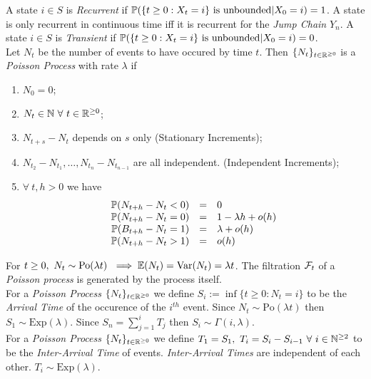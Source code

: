 \documentclass[11pt,a4paper]{article}
\begin{document}
A state $i\in S$ is \textit{Recurrent} if $\prob(\{t\geq0:X_t=i\}\mathrm{\ is\ unbounded}|X_0=i)=1$. A state is only recurrent in continuous time iff it is recurrent for the \textit{Jump Chain} $Y_n$.
A state $i\in S$ is \textit{Transient} if $\prob(\{t\geq0:X_t=i\}\mathrm{\ is\ unbounded}|X_0=i)=0$.\\

Let $N_t$ be the number of events to have occured by time $t$. Then $\{N_t\}_{t\in\mathbb{R}^{\geq0}}$ is a \textit{Poisson Process} with rate $\lambda$ if
\begin{enumerate}
	\item $N_0=0$;
	\item $N_t\in\nats\ \forall\ t\in\reals^{\geq0}$;
	\item $N_{t+s}-N_t$ depends on $s$ only (Stationary Increments);
	\item $N_{t_2}-N_{t_1},\dots,N_{t_n}-N_{t_{n-1}}$ are all independent. (Independent Increments);
	\item $\forall\ t,h>0$ we have
	\[\begin{array}{rcl}
	\mathbb{P}(N_{t+h}-N_t<0)&=&0\\
	\mathbb{P}(N_{t+h}-N_t=0)&=&1-\lambda h+o(h)\\
	\mathbb{P}(B_{t+h}-N_t=1)&=&\lambda+o(h)\\
	\mathbb{P}(N_{t+h}-N_t>1)&=&o(h)
	\end{array}\]
\end{enumerate}
For $t\geq0,\ N_t\sim\mathrm{Po}(\lambda t)\ \implies\mathbb{E}(N_t)=\mathrm{Var}(N_t)=\lambda t$. The filtration $\mathcal{F}_t$ of a \textit{Poisson process} is generated by the process itself.\\

For a \textit{Poisson Process} $\{N_t\}_{t\in\mathbb{R}^{\geq0}}$ we define $S_i:=\inf\{t\geq0:N_t=i\}$ to be the \textit{Arrival Time} of the occurence of the $i^{th}$ event. Since $N_t\sim\mathrm{Po}(\lambda t)$ then $S_1\sim\mathrm{Exp}(\lambda)$. Since $S_n=\sum_{j=1}^iT_j$ then $S_i\sim\Gamma(i,\lambda)$.\\

For a \textit{Poisson Process} $\{N_t\}_{t\in\mathbb{R}^{\geq0}}$ we define $T_1=S_1,\ T_i=S_i-S_{i-1}\ \forall\ i\in\nats^{\geq2}$ to be the \textit{Inter-Arrival Time} of events. \textit{Inter-Arrival Times} are independent of each other. $T_i\sim\mathrm{Exp}(\lambda)$.\\
\end{document}
